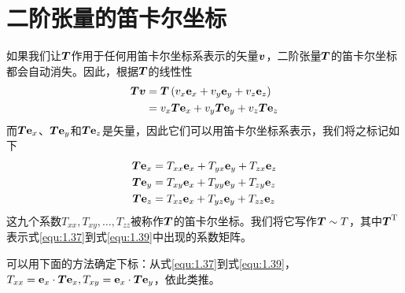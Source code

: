 \section{二阶张量的笛卡尔坐标}
如果我们让$\boldsymbol{T}$作用于任何用笛卡尔坐标系表示的矢量$\boldsymbol{v}$，二阶张量$\boldsymbol{T}$的笛卡尔坐标都会自动消失。因此，根据$\boldsymbol{T}$的线性性
\begin{align}\label{equ:1.36}
	\boldsymbol{Tv}&=\boldsymbol{T}\left( v_x\mathbf{e}_x+v_y\mathbf{e}_y+v_z\mathbf{e}_z \right)\nonumber\\
	&=v_x\boldsymbol{T}\mathbf{e}_x+v_y\boldsymbol{T}\mathbf{e}_y+v_z\boldsymbol{T}\mathbf{e}_z
\end{align}
而$\boldsymbol{T}\mathbf{e}_x$、$\boldsymbol{T}\mathbf{e}_y$和$\boldsymbol{T}\mathbf{e}_z$是矢量，因此它们可以用笛卡尔坐标系表示，我们将之标记如下
\begin{align}
	\boldsymbol{T}\mathbf{e}_x&=T_{xx}\mathbf{e}_x+T_{yx}\mathbf{e}_y+T_{zx}\mathbf{e}_z\label{equ:1.37}\\
	\boldsymbol{T}\mathbf{e}_y&=T_{xy}\mathbf{e}_x+T_{yy}\mathbf{e}_y+T_{zy}\mathbf{e}_z\label{equ:1.38}\\
	\boldsymbol{T}\mathbf{e}_z&=T_{xz}\mathbf{e}_x+T_{yz}\mathbf{e}_y+T_{zz}\mathbf{e}_z\label{equ:1.39}
\end{align}
这九个系数$T_{xx},T_{xy},\dots,T_{zz}$被称作$\boldsymbol{T}$的笛卡尔坐标。我们将它写作$\boldsymbol{T}\sim T$，其中$\boldsymbol{T}^{\mathrm{T}}$表示式\eqref{equ:1.37}到式\eqref{equ:1.39}中出现的系数矩阵。

可以用下面的方法确定下标：从式\eqref{equ:1.37}到式\eqref{equ:1.39}，$T_{xx}=\mathbf{e}_x\cdot \boldsymbol{T}\mathbf{e}_x , T_{xy}=\mathbf{e}_x\cdot \boldsymbol{T}\mathbf{e}_y$，依此类推。

